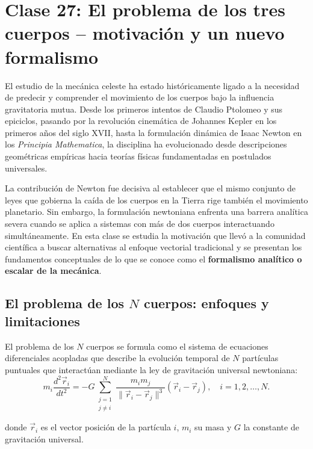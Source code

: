\chapter{Clase 27: El problema de los tres cuerpos -- motivación y un nuevo formalismo}

El estudio de la mecánica celeste ha estado históricamente ligado a la necesidad de predecir y comprender el movimiento de los cuerpos bajo la influencia gravitatoria mutua. Desde los primeros intentos de Claudio Ptolomeo y sus epiciclos, pasando por la revolución cinemática de Johannes Kepler en los primeros años del siglo XVII, hasta la formulación dinámica de Isaac Newton en los \emph{Principia Mathematica}, la disciplina ha evolucionado desde descripciones geométricas empíricas hacia teorías físicas fundamentadas en postulados universales.

La contribución de Newton fue decisiva al establecer que el mismo conjunto de leyes que gobierna la caída de los cuerpos en la Tierra rige también el movimiento planetario. Sin embargo, la formulación newtoniana enfrenta una barrera analítica severa cuando se aplica a sistemas con más de dos cuerpos interactuando simultáneamente. En esta clase se estudia la motivación que llevó a la comunidad científica a buscar alternativas al enfoque vectorial tradicional y se presentan los fundamentos conceptuales de lo que se conoce como el \textbf{formalismo analítico o escalar de la mecánica}.

\section{El problema de los \texorpdfstring{$N$}{N} cuerpos: enfoques y limitaciones}
El problema de los \(N\) cuerpos se formula como el sistema de ecuaciones diferenciales acopladas que describe la evolución temporal de \(N\) partículas puntuales que interactúan mediante la ley de gravitación universal newtoniana:
\[
 m_i \frac{d^2 \vec{r}_i}{dt^2} = -G \sum_{\substack{j=1 \\ j \neq i}}^{N} \frac{m_i m_j}{\|\vec{r}_i - \vec{r}_j\|^3}(\vec{r}_i - \vec{r}_j),
 \quad i = 1,2,\dots,N.
\]

donde \(\vec{r}_i\) es el vector posición de la partícula \(i\), \(m_i\) su masa y \(G\) la constante de gravitación universal.

